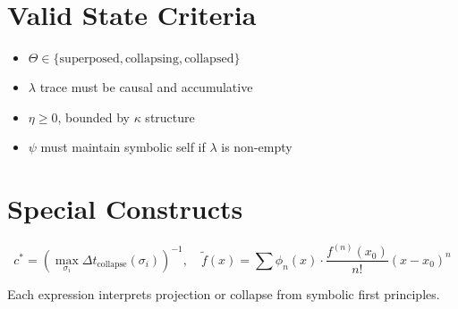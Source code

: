 \section*{Valid State Criteria}

\begin{itemize}
\item $\Theta \in \{\text{superposed}, \text{collapsing}, \text{collapsed}\}$
\item $\lambda$ trace must be causal and accumulative
\item $\eta \geq 0$, bounded by $\kappa$ structure
\item $\psi$ must maintain symbolic self if $\lambda$ is non-empty
\end{itemize}

\section*{Special Constructs}

\[
c^* = \left( \max_{\sigma_i} \Delta t_{\text{collapse}}(\sigma_i) \right)^{-1}, \quad
\tilde{f}(x) = \sum \phi_n(x) \cdot \frac{f^{(n)}(x_0)}{n!} (x - x_0)^n
\]

Each expression interprets projection or collapse from symbolic first principles.

